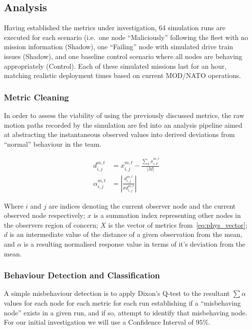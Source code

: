 \subsection{Analysis}
Having established the metrics under investigation, 64 simulation runs are executed for each scenario (i.e.\ one node ``Maliciously'' following the fleet with no mission information (Shadow), one ``Failing'' node with simulated drive train issues (Shadow), and one baseline control scenario where all nodes are behaving appropriately (Control).
Each of these simulated missions last for an hour, matching realistic deployment times based on current MOD/NATO operations\cite{Bolster2014a}.

\subsubsection{Metric Cleaning}
In order to assess the viability of using the previously discussed metrics, the raw motion paths recorded by the simulation are fed into an analysis pipeline aimed at abstracting the instantaneous observed values into derived deviations from ``normal'' behaviour in the team.

\begin{align}
  d_{i,j}^{m,t} &= x_{i,j}^{m,t} - \frac{\sum_k x_{i,k}^{m,t}}{|M|}\label{eq:d}\\
  \alpha_{i,j}^{m,t} &= | \frac{d_{i,j}^{m,t}}{\sigma{d_{i,j}^{m,t}}}|\label{eq:dd}
\end{align}

Where $i$ and $j$ are indices denoting the current observer node and the current observed node respectively; $x$ is a summation index representing other nodes in the observers region of concern; $X$ is the vector of metrics from~\ref{eq:phys_vector}; $d$ is an intermediate value of the distance of a given observation from the mean, and $\alpha$ is a resulting normalised response value in terms of it's deviation from the mean.

\subsubsection{Behaviour Detection and Classification}
A simple misbehaviour detection is to apply Dixon's Q-test \cite{Dean1951} to the resultant $\sum\alpha$ values for each node for each metric for each run establishing if a ``misbehaving node'' exists in a given run, and if so, attempt to identify that misbehaving node. 
For our initial investigation we will use a Confidence Interval of $95\%$.

